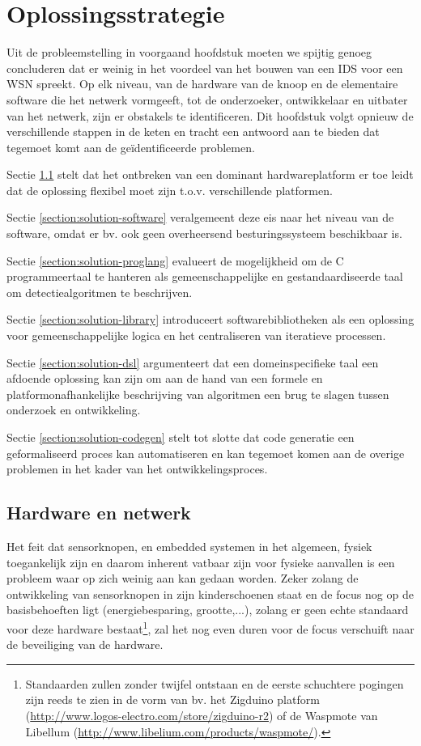 
\chapter{Oplossingsstrategie}
\label{chapter:oplossingsstrategie}

Uit de probleemstelling in voorgaand hoofdstuk moeten we spijtig genoeg
concluderen dat er weinig in het voordeel van het bouwen van een IDS voor een
WSN spreekt. Op elk niveau, van de hardware van de knoop en de elementaire
software die het netwerk vormgeeft, tot de onderzoeker, ontwikkelaar en
uitbater van het netwerk, zijn er obstakels te identificeren. Dit hoofdstuk
volgt opnieuw de verschillende stappen in de keten en tracht een antwoord aan
te bieden dat tegemoet komt aan de ge\"identificeerde problemen.

Sectie \ref{section:solution-node-wsn} stelt dat het ontbreken van een dominant
hardwareplatform er toe leidt dat de oplossing flexibel moet zijn t.o.v.
verschillende platformen.

Sectie \ref{section:solution-software} veralgemeent deze eis naar het niveau
van de software, omdat er bv. ook geen overheersend besturingssysteem
beschikbaar is.

Sectie \ref{section:solution-proglang} evalueert de mogelijkheid om de C
programmeertaal te hanteren als gemeenschappelijke en gestandaardiseerde taal
om detectiealgoritmen te beschrijven.

Sectie \ref{section:solution-library} introduceert softwarebibliotheken als een
oplossing voor gemeenschappelijke logica en het centraliseren van iteratieve
processen.

Sectie \ref{section:solution-dsl} argumenteert dat een domeinspecifieke taal
een afdoende oplossing kan zijn om aan de hand van een formele en
platformonafhankelijke beschrijving van algoritmen een brug te slagen tussen
onderzoek en ontwikkeling.

Sectie \ref{section:solution-codegen} stelt tot slotte dat code generatie een
geformaliseerd proces kan automatiseren en kan tegemoet komen aan de overige
problemen in het kader van het ontwikkelingsproces.

\section{Hardware en netwerk}
\label{section:solution-node-wsn}

Het feit dat sensorknopen, en embedded systemen in het algemeen, fysiek
toegankelijk zijn en daarom inherent vatbaar zijn voor fysieke aanvallen is een
probleem waar op zich weinig aan kan gedaan worden. Zeker zolang de
ontwikkeling van sensorknopen in zijn kinderschoenen staat en de focus nog op
de basisbehoeften ligt (energiebesparing, grootte,...), zolang er geen echte
standaard voor deze hardware bestaat\footnote{Standaarden zullen zonder twijfel
ontstaan en de eerste schuchtere pogingen zijn reeds te zien in de vorm van bv.
het Zigduino platform (\url{http://www.logos-electro.com/store/zigduino-r2}) of
de Waspmote van Libellum (\url{http://www.libelium.com/products/waspmote/}).},
zal het nog even duren voor de focus verschuift naar de beveiliging van de
hardware.

